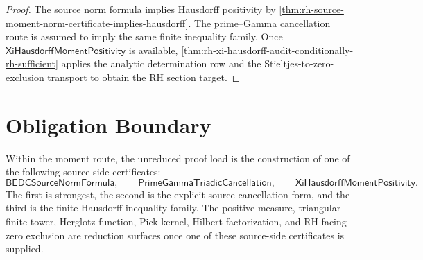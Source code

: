 \begin{proof}
The source norm formula implies Hausdorff positivity by
\autoref{thm:rh-source-moment-norm-certificate-implies-hausdorff}. The
prime--Gamma cancellation route is assumed to imply the same finite
inequality family. Once $\mathsf{XiHausdorffMomentPositivity}$ is
available, \autoref{thm:rh-xi-hausdorff-audit-conditionally-rh-sufficient}
applies the analytic determination row and the Stieltjes-to-zero-exclusion
transport to obtain the RH section target.
\end{proof}

\section{Obligation Boundary}
\label{sec:rh-final-obligation-boundary}

\begin{principle}
\label{prin:rh-final-moment-core-status}
Within the moment route, the unreduced proof load is the construction of
one of the following source-side certificates:
$$
\mathsf{BEDCSourceNormFormula},
\qquad
\mathsf{PrimeGammaTriadicCancellation},
\qquad
\mathsf{XiHausdorffMomentPositivity}.
$$
The first is strongest, the second is the explicit source cancellation
form, and the third is the finite Hausdorff inequality family. The
positive measure, triangular finite tower, Herglotz function, Pick
kernel, Hilbert factorization, and RH-facing zero exclusion are reduction
surfaces once one of these source-side certificates is supplied.
\end{principle}
